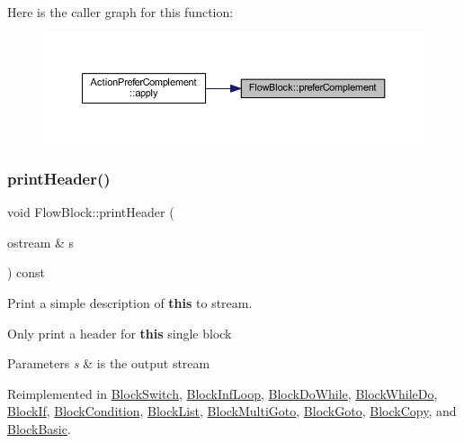 Here is the caller graph for this function\+:
\nopagebreak
\begin{figure}[H]
\begin{center}
\leavevmode
\includegraphics[width=350pt]{class_flow_block_a6ab46f9a87bc94b30bd3bee0923b3f51_icgraph}
\end{center}
\end{figure}
\mbox{\label{class_flow_block_a0d19c5b80186cf289dfbe0ce9e3ce37a}} 
\subsubsection{\texorpdfstring{printHeader()}{printHeader()}}
{\footnotesize\ttfamily void Flow\+Block\+::print\+Header (\begin{DoxyParamCaption}\item[{ostream \&}]{s }\end{DoxyParamCaption}) const\hspace{0.3cm}{\ttfamily [virtual]}}



Print a simple description of {\bfseries{this}} to stream. 

Only print a header for {\bfseries{this}} single block 
\begin{DoxyParams}{Parameters}
{\em s} & is the output stream \\
\hline
\end{DoxyParams}


Reimplemented in \mbox{\hyperlink{class_block_switch_a57143ab3d1cea8c6962bdcf52fbe4bdf}{Block\+Switch}}, \mbox{\hyperlink{class_block_inf_loop_a52090deeaa2673ea5afedca0331d3027}{Block\+Inf\+Loop}}, \mbox{\hyperlink{class_block_do_while_a95baa39da580d08f36b507fefe61823f}{Block\+Do\+While}}, \mbox{\hyperlink{class_block_while_do_a298687d8d9dbe264f779cca2c89ca32e}{Block\+While\+Do}}, \mbox{\hyperlink{class_block_if_a6c45f688f991ec5f1412c51e56bf5fd3}{Block\+If}}, \mbox{\hyperlink{class_block_condition_a94ff21df098dda7c4cb50c87c500c439}{Block\+Condition}}, \mbox{\hyperlink{class_block_list_ac49227f39d0238f4d86c76a170cc009b}{Block\+List}}, \mbox{\hyperlink{class_block_multi_goto_a0886201717ed839e30e4e8e2b39d33d7}{Block\+Multi\+Goto}}, \mbox{\hyperlink{class_block_goto_a01f0af5a9043ec72c96e3f2591d0c469}{Block\+Goto}}, \mbox{\hyperlink{class_block_copy_aa360ee1fda40a1cb2289cb92e615fb9c}{Block\+Copy}}, and \mbox{\hyperlink{class_block_basic_a5a0f22c6bd8b164e787dc6a6d756952a}{Block\+Basic}}.



